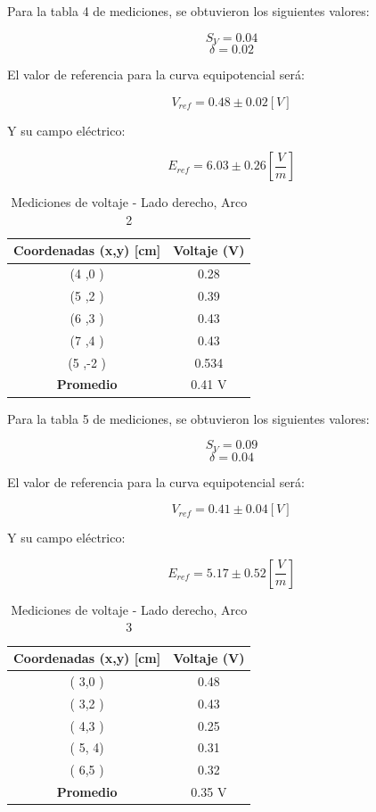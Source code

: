 \documentclass[11pt,twocolumn]{article}
\begin{document}
Para la tabla 4 de mediciones, se obtuvieron los siguientes valores:

\[S_V = 0.04\]
\[\delta = 0.02\]

El valor de referencia para la curva equipotencial será:

\[V_{ref} = 0.48 \pm 0.02 [V]\]

Y su campo eléctrico:

\[E_{ref} = 6.03 \pm 0.26 [\frac{V}{m}]\]

\begin{table}[h]
\centering
\caption{Mediciones de voltaje - Lado derecho, Arco 2}
\begin{tabular}{cc}
\toprule
\textbf{Coordenadas (x,y) [cm]} & \textbf{Voltaje (V)} \\
\midrule
(4 ,0 ) & 0.28 \\
(5 ,2 ) &  0.39\\
(6 ,3 ) &  0.43\\
(7 ,4 ) &  0.43\\
(5 ,-2 ) & 0.534 \\
\midrule
\textbf{Promedio} &  0.41 V\\
\bottomrule
\end{tabular}
\end{table}

Para la tabla 5 de mediciones, se obtuvieron los siguientes valores:

\[S_V = 0.09\]
\[\delta = 0.04\]

El valor de referencia para la curva equipotencial será:

\[V_{ref} = 0.41 \pm 0.04 [V]\]

Y su campo eléctrico:

\[E_{ref} = 5.17 \pm 0.52 [\frac{V}{m}]\]

\begin{table}[h]
\centering
\caption{Mediciones de voltaje - Lado derecho, Arco 3}
\begin{tabular}{cc}
\toprule
\textbf{Coordenadas (x,y) [cm]} & \textbf{Voltaje (V)} \\
\midrule
( 3,0 ) &  0.48\\
( 3,2 ) &  0.43\\
( 4,3 ) &  0.25\\
( 5, 4) &  0.31\\
( 6,5 ) & 0.32 \\
\midrule
\textbf{Promedio} &  0.35 V\\
\bottomrule
\end{tabular}
\end{table}
\end{document}

